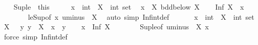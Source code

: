 \begin{isabellebody}
\isanewline
\ \ \isamarkupfalse%
\ Sup{\isacharunderscore}{\kern0pt}le\ {\isacharequal}{\kern0pt}\ this\isanewline
\isanewline
\ \ \isacommand{{\isacharbraceleft}{\kern0pt}}\isamarkupfalse%
\ \isamarkupfalse%
\ x\ {\isacharcolon}{\kern0pt}{\isacharcolon}{\kern0pt}\ int\ \ X\ {\isacharcolon}{\kern0pt}{\isacharcolon}{\kern0pt}\ {\isachardoublequoteopen}int\ set{\isachardoublequoteclose}\ \isamarkupfalse%
\ {\isachardoublequoteopen}x\ {\isasymin}\ X{\isachardoublequoteclose}\ {\isachardoublequoteopen}bdd{\isacharunderscore}{\kern0pt}below\ X{\isachardoublequoteclose}\ \isamarkupfalse%
\ \isamarkupfalse%
\ {\isachardoublequoteopen}Inf\ X\ {\isasymle}\ x{\isachardoublequoteclose}\isanewline
\ \ \ \ \ \ \isamarkupfalse%
\ le{\isacharunderscore}{\kern0pt}Sup{\isacharbrackleft}{\kern0pt}of\ {\isachardoublequoteopen}{\isacharminus}{\kern0pt}x{\isachardoublequoteclose}\ {\isachardoublequoteopen}uminus\ {\isacharbackquote}{\kern0pt}\ X{\isachardoublequoteclose}{\isacharbrackright}{\kern0pt}\ \isamarkupfalse%
\ {\isacharparenleft}{\kern0pt}auto\ simp{\isacharcolon}{\kern0pt}\ Inf{\isacharunderscore}{\kern0pt}int{\isacharunderscore}{\kern0pt}def{\isacharparenright}{\kern0pt}\ \isacommand{{\isacharbraceright}{\kern0pt}}\isamarkupfalse%
\isanewline
\ \ \isacommand{{\isacharbraceleft}{\kern0pt}}\isamarkupfalse%
\ \isamarkupfalse%
\ x\ {\isacharcolon}{\kern0pt}{\isacharcolon}{\kern0pt}\ int\ \ X\ {\isacharcolon}{\kern0pt}{\isacharcolon}{\kern0pt}\ {\isachardoublequoteopen}int\ set{\isachardoublequoteclose}\ \isamarkupfalse%
\ {\isachardoublequoteopen}X\ {\isasymnoteq}\ {\isacharbraceleft}{\kern0pt}{\isacharbraceright}{\kern0pt}{\isachardoublequoteclose}\ {\isachardoublequoteopen}{\isasymAnd}y{\isachardot}{\kern0pt}\ y\ {\isasymin}\ X\ {\isasymLongrightarrow}\ x\ {\isasymle}\ y{\isachardoublequoteclose}\ \isamarkupfalse%
\ \isamarkupfalse%
\ {\isachardoublequoteopen}x\ {\isasymle}\ Inf\ X{\isachardoublequoteclose}\isanewline
\ \ \ \ \ \ \isamarkupfalse%
\ Sup{\isacharunderscore}{\kern0pt}le{\isacharbrackleft}{\kern0pt}of\ {\isachardoublequoteopen}uminus\ {\isacharbackquote}{\kern0pt}\ X{\isachardoublequoteclose}\ {\isachardoublequoteopen}{\isacharminus}{\kern0pt}x{\isachardoublequoteclose}{\isacharbrackright}{\kern0pt}\ \isamarkupfalse%
\ {\isacharparenleft}{\kern0pt}force\ simp{\isacharcolon}{\kern0pt}\ Inf{\isacharunderscore}{\kern0pt}int{\isacharunderscore}{\kern0pt}def{\isacharparenright}{\kern0pt}\ \isacommand{{\isacharbraceright}{\kern0pt}}\isamarkupfalse%

\end{isabellebody}
